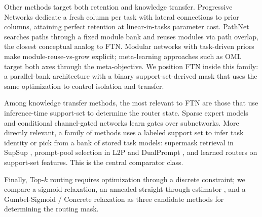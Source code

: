 \documentclass{article}
\begin{document}
Other methods target both retention and knowledge transfer. Progressive Networks \citep{rusu2016progressive} dedicate a fresh column per task with lateral connections to prior columns, attaining perfect retention at linear-in-tasks parameter cost. PathNet \citep{fernando2017pathnet} searches paths through a fixed module bank and reuses modules via path overlap, the closest conceptual analog to FTN. Modular networks with task-driven priors \citep{veniat2021mntdp} make module-reuse-vs-grow explicit; meta-learning approaches such as OML \citep{javed2019oml} target both axes through the meta-objective. We position FTN inside this family: a parallel-bank architecture with a binary support-set-derived mask that uses the same optimization to control isolation and transfer.

Among knowledge transfer methods, the most relevant to FTN are those that use inference-time support-set to determine the router state. Sparse expert models \citep{shazeer2017outrageously,fedus2022switch} and conditional channel-gated networks \citep{abati2020conditional} learn gates over subnetworks. More directly relevant, a family of methods uses a labeled support set to infer task identity or pick from a bank of stored task models: supermask retrieval in SupSup \citep{wortsman2020supermasks}, prompt-pool selection in L2P and DualPrompt \citep{wang2022learning,wang2022dualprompt}, and learned routers on support-set features. This is the central comparator class.

Finally, Top-$k$ routing requires optimization through a discrete constraint; we compare a sigmoid relaxation, an annealed straight-through estimator \citep{bengio2013estimating}, and a Gumbel-Sigmoid / Concrete relaxation \citep{jang2017categorical,maddison2017concrete} as three candidate methods for determining the routing mask. %
\end{document}
